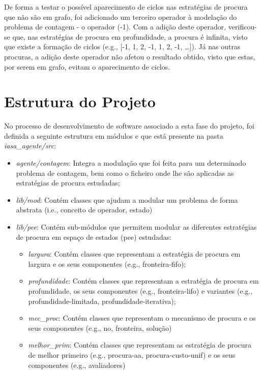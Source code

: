 De forma a testar o possível aparecimento de ciclos nas estratégias de procura que não são em grafo, foi adicionado um terceiro operador à modelação do problema de contagem - o operador (-1).
Com a adição deste operador, verificou-se que, nas estratégias de procura em profundidade, a procura é infinita, visto que existe a formação de ciclos (e.g., [-1, 1, 2, -1, 1, 2, -1, \ldots]).
Já nas outras procuras, a adição deste operador não afetou o resultado obtido, visto que estas, por serem em grafo, evitam o aparecimento de ciclos.


\section{Estrutura do Projeto}\label{sec:estrutura-do-projeto-3}

No processo de desenvolvimento de software associado a esta fase do projeto, foi definida a seguinte estrutura em módulos e que está presente na pasta \textit{iasa\_agente/src}:

\begin{itemize}
    \item \textit{agente/contagem}: Integra a modulação que foi feita para um determinado problema de contagem, bem como o ficheiro onde lhe são aplicadas as estratégias de procura estudadas;
    \item \textit{lib/mod}: Contém classes que ajudam a modular um problema de forma abstrata (i.e., conceito de operador, estado)
    \item \textit{lib/pee}: Contém sub-módulos que permitem modular as diferentes estratégias de procura em espaço de estados (pee) estudadas:
    \begin{itemize}
        \item \textit{largura}: Contém classes que representam a estratégia de procura em largura e os seus componentes (e.g., fronteira-fifo);
        \item \textit{profundidade}: Contém classes que representam a estratégia de procura em profundidade, os seus componentes (e.g., fronteira-lifo) e variantes (e.g., profundidade-limitada, profundidade-iterativa);
        \item \textit{mec\_proc}: Contém classes que representam o mecanismo de procura e os seus componentes (e.g., no, fronteira, solução)
        \item \textit{melhor\_prim}: Contém classes que representam as estratégia de procura de melhor primeiro (e.g., procura-aa, procura-custo-unif) e os seus componentes (e.g., avaliadores)
    \end{itemize}
\end{itemize}
